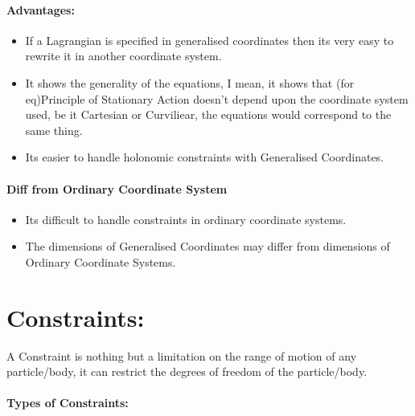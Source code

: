 \documentclass[a4paper]{article}
\begin{document}
		\paragraph*{Advantages:}
		\begin{itemize}
			\item If a Lagrangian is specified in generalised coordinates then its very easy to rewrite it in another coordinate system.
			\item It shows the generality of the equations, I mean, it shows that (for eq)Principle of Stationary Action doesn't depend upon the coordinate system used, be it Cartesian or Curviliear, the equations would correspond to the same thing.
			\item Its easier to handle holonomic constraints with Generalised Coordinates.
		\end{itemize}
		
		\paragraph*{Diff from Ordinary Coordinate System}
		\begin{itemize}
			\item Its difficult to handle constraints in ordinary coordinate systems.
			\item The dimensions of Generalised Coordinates may differ from dimensions of Ordinary Coordinate Systems.
		\end{itemize}

	\section*{Constraints: }
		
		\noindent	

		A Constraint is nothing but a limitation on the range of motion of any particle/body, it can restrict the degrees of freedom of the particle/body.
		\paragraph*{Types of Constraints: }
\end{document}
